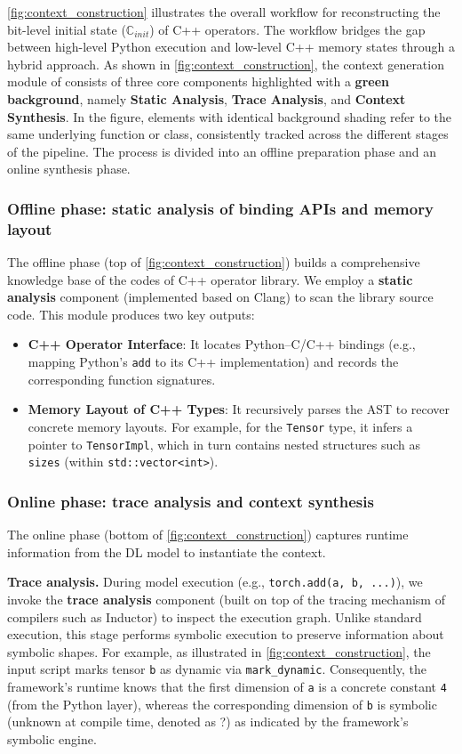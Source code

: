 \autoref{fig:context_construction} illustrates the overall workflow for reconstructing the bit-level initial state ($\mathbb{C}_{init}$) of C++ operators. 
The workflow bridges the gap between high-level Python execution and low-level C++ memory states through a hybrid approach.
As shown in \autoref{fig:context_construction}, the context generation module of \mysys consists of three core components highlighted with a \textbf{green background}, namely \textbf{Static Analysis}, \textbf{Trace Analysis}, and \textbf{Context Synthesis}. 
In the figure, elements with identical background shading refer to the same underlying function or class, consistently tracked across the different stages of the pipeline.
The process is divided into an offline preparation phase and an online synthesis phase.

\subsubsection{Offline phase: static analysis of binding APIs and memory layout}
The offline phase (top of \autoref{fig:context_construction}) builds a comprehensive knowledge base of the codes of C++ operator library.
We employ a \textbf{static analysis} component (implemented based on Clang) to scan the library source code.
This module produces two key outputs:
\begin{itemize}
  \item \textbf{C++ Operator Interface}: It locates Python–C/C++ bindings (e.g., mapping Python's \texttt{add} to its C++ implementation) and records the corresponding function signatures.
  \item \textbf{Memory Layout of C++ Types}: It recursively parses the AST to recover concrete memory layouts.
  For example, for the \texttt{Tensor} type, it infers a pointer to \texttt{TensorImpl}, which in turn contains nested structures such as \texttt{sizes} (within \texttt{std::vector<int>}).
\end{itemize}

\subsubsection{Online phase: trace analysis and context synthesis}
The online phase (bottom of \autoref{fig:context_construction}) captures runtime information from the DL model to instantiate the context.

\textbf{Trace analysis.}
During model execution (e.g., \texttt{torch.add(a, b, ...)}), we invoke the \textbf{trace analysis} component (built on top of the tracing mechanism of compilers such as Inductor) to inspect the execution graph.
Unlike standard execution, this stage performs symbolic execution to preserve information about symbolic shapes.
For example, as illustrated in \autoref{fig:context_construction}, the input script marks tensor \texttt{b} as dynamic via \texttt{mark\_dynamic}.
Consequently, the framework’s runtime knows that the first dimension of \texttt{a} is a concrete constant \texttt{4} (from the Python layer), whereas the corresponding dimension of \texttt{b} is symbolic (unknown at compile time, denoted as ?) as indicated by the framework’s symbolic engine.

